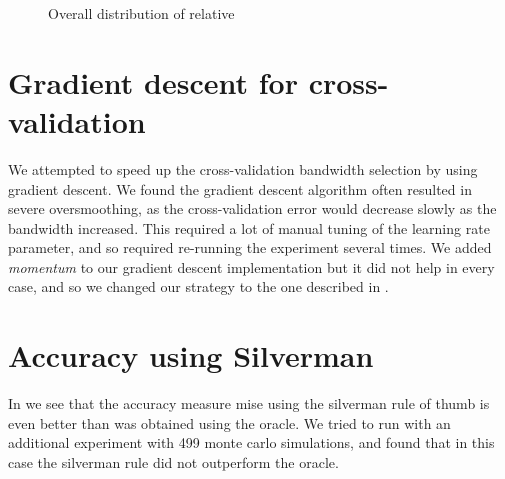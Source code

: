 \begin{figure}[htbp]
\begin{subfigure}[t]{0.45\textwidth}
        \label{fig:discussion:overall_centroiddrift_boxplot:peak}
    \end{subfigure}
    \caption{Overall distribution of relative }
    \label{fig:discussion:overall_centroiddrift_boxplot}
\end{figure}

\section{Gradient descent for cross-validation}
\label{sec:discussion:gradient_descent}

We attempted to speed up the cross-validation bandwidth selection by using gradient descent.
We found the gradient descent algorithm often resulted in severe oversmoothing,
as the cross-validation error would decrease slowly as the bandwidth increased.
This required a lot of manual tuning of the learning rate parameter, and so required re-running the experiment several times.
We added \textit{momentum} to our gradient descent implementation but it did not help in every case, and so we changed our strategy to the one described in .

\section{Accuracy using Silverman}

In  we see that the accuracy measure \gls{mise} using the \gls{silverman} rule of thumb is even better than was obtained using the \gls{oracle}.
We tried to run with an additional experiment with 499 monte carlo simulations, and found that in this case the \gls{silverman} rule did not outperform the \gls{oracle}.

